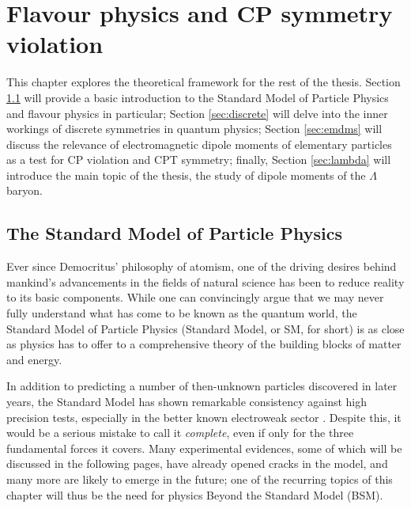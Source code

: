 \chapter{Flavour physics and CP symmetry violation}
This chapter explores the theoretical framework for the rest of the thesis.
Section \ref{sec:sm} will provide a basic introduction to the Standard Model of Particle Physics and flavour physics in particular;
Section \ref{sec:discrete} will delve into the inner workings of discrete symmetries in quantum physics;
Section \ref{sec:emdms} will discuss the relevance of electromagnetic dipole moments of elementary particles as a test for CP violation and CPT symmetry;
finally, Section \ref{sec:lambda} will introduce the main topic of the thesis, the study of dipole moments of the $\Lambda$ baryon.

\section{The Standard Model of Particle Physics}
\label{sec:sm}
Ever since Democritus' philosophy of atomism, one of the driving desires behind mankind's advancements in the fields of natural science has been to reduce reality to its basic components.
While one can convincingly argue that we may never fully understand what has come to be known as the quantum world, the Standard Model of Particle Physics (Standard Model, or SM, for short) \cite{aitchinson_hey} is as close as physics has to offer to a comprehensive theory of the building blocks of matter and energy.

In addition to predicting a number of then-unknown particles discovered in later years, the Standard Model has shown remarkable consistency against high precision tests, especially in the better known electroweak sector \cite{Erler_2019}.
Despite this, it would be a serious mistake to call it \textit{complete}, even if only for the three fundamental forces it covers.
Many experimental evidences, some of which will be discussed in the following pages, have already opened cracks in the model, and many more are likely to emerge in the future;
one of the recurring topics of this chapter will thus be the need for physics Beyond the Standard Model (BSM).

